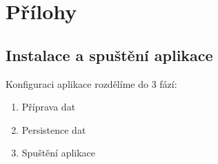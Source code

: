 \documentclass[12pt,a4paper]{report}
\begin{document}



\tableofcontents












\listoffigures


\appendix
\chapter{Přílohy}

\section{Instalace a spuštění aplikace}

Konfiguraci aplikace rozdělíme do $3$ fází:

\begin{enumerate}
    \item Příprava dat
    \item Persistence dat
    \item Spuštění aplikace
\end{enumerate}
\end{document}

